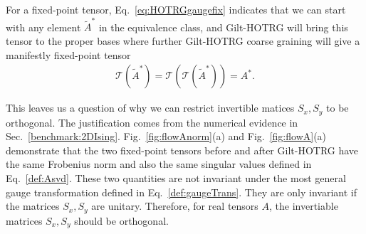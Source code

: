 \documentclass[aps,prb,reprint,superscriptaddress]{revtex4-2}
\begin{document}
For a fixed-point tensor, Eq.~\eqref{eq:HOTRGgaugefix} indicates that we
can start with any element $\tilde{A}^*$ in the equivalence class, and
Gilt-HOTRG will bring this tensor to the proper bases where further
Gilt-HOTRG coarse graining will give a manifestly fixed-point tensor
%
\begin{align}\label{eq:GiltHOTRGfixT}
    \mathcal{T}(\tilde{A}^*) =
    \mathcal{T}\left(\mathcal{T}(\tilde{A}^*)  \right) = A^*.
\end{align}
%

This leaves us a question of why we can restrict invertible matices
$S_x, S_y$ to be orthogonal. The justification comes from the
numerical evidence in Sec.~\ref{benchmark:2DIsing}.
Fig.~\ref{fig:flowAnorm}(a) and Fig.~\ref{fig:flowA}(a) demonstrate
that the two fixed-point tensors before and after Gilt-HOTRG
have the same Frobenius norm and also the same singular values defined
in Eq.~\eqref{def:Asvd}. These two quantities are not invariant under
the most general gauge transformation defined in
Eq.~\eqref{def:gaugeTrans}. They are only invariant if the matrices
$S_x,S_y$ are unitary. Therefore, for real tensors $A$, the invertiable
matrices $S_x,S_y$ should be orthogonal.
%
\end{document}
